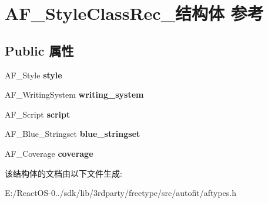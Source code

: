 \hypertarget{struct_a_f___style_class_rec__}{}\section{A\+F\+\_\+\+Style\+Class\+Rec\+\_\+结构体 参考}
\label{struct_a_f___style_class_rec__}
\subsection*{Public 属性}
\begin{DoxyCompactItemize}
\item 
\mbox{\label{struct_a_f___style_class_rec___a997af39782d7ae98c2a2a373e82bdb49}} 
A\+F\+\_\+\+Style {\bfseries style}
\item 
\mbox{\label{struct_a_f___style_class_rec___a3c99cf55e4d14ff39a1968334cedf1fd}} 
A\+F\+\_\+\+Writing\+System {\bfseries writing\+\_\+system}
\item 
\mbox{\label{struct_a_f___style_class_rec___aec463d3f68fc4527b4bac995cad163a4}} 
A\+F\+\_\+\+Script {\bfseries script}
\item 
\mbox{\label{struct_a_f___style_class_rec___af5081404784bd042f0447d727c6ab797}} 
A\+F\+\_\+\+Blue\+\_\+\+Stringset {\bfseries blue\+\_\+stringset}
\item 
\mbox{\label{struct_a_f___style_class_rec___afe1c209b36afa51c46c365ad3309cc06}} 
A\+F\+\_\+\+Coverage {\bfseries coverage}
\end{DoxyCompactItemize}


该结构体的文档由以下文件生成\+:\begin{DoxyCompactItemize}
\item 
E\+:/\+React\+O\+S-\/0../sdk/lib/3rdparty/freetype/src/autofit/aftypes.\+h\end{DoxyCompactItemize}
